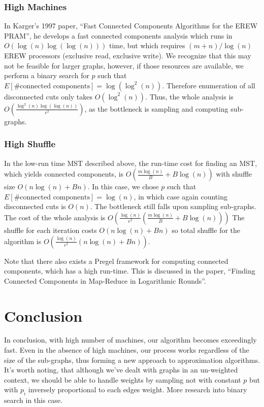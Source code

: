 \documentclass[12pt]{article}
\begin{document}
\subsubsection{High Machines}
In Karger's 1997 paper, ``Fast Connected Components Algorithms for the EREW PRAM'', he develops a fast connected components analysis which runs in $O(\log(n) \log(\log(n)))$ time, but which requires $(m + n)/\log(n)$ EREW processors (exclusive read, exclusive write). We recognize that this may not be feasible for larger graphs, however, if those resources are available, we perform a binary search for $p$ such that $E[\text{\# connected components}] = \log(\log^2(n))$. Therefore enumeration of all disconnected cuts only takes $O(\log^2(n))$. Thus, the whole analysis is $O(\frac{\log^2(n) \log(\log(n))}{\epsilon^2})$, as the bottleneck is sampling and computing sub-graphs.

\subsubsection{High Shuffle}

In the low-run time MST described above, the run-time cost for finding an MST, which yields connected components, is $O(\frac{m \log(n)}{B} + B\log(n))$ with shuffle size $O(n\log(n) + Bn)$. In this case, we chose $p$ such that $E[\text{\# connected components}] = \log(n)$, in which case again counting disconnected cuts is $O(n)$. The bottleneck still falls upon sampling sub-graphs. The cost of the whole analysis is $O(\frac{\log(n)}{\epsilon^2} (\frac{m \log(n)}{B} + B \log(n)))$ The shuffle for each iteration costs $O(n\log(n) + Bn)$ so total shuffle for the algorithm is $O(\frac{\log(n)}{\epsilon^2}(n\log(n) + Bn))$.

Note that there also exists a Pregel framework for computing connected components, which has a high run-time. This is discussed in the paper, ``Finding Connected Components in Map-Reduce in Logarithmic Rounds''.

\section{Conclusion} In conclusion, with high number of machines, our algorithm becomes exceedingly fast. Even in the absence of high machines, our process works regardless of the size of the sub-graphs, thus forming a new approach to approximation algorithms. It's worth noting, that although we've dealt with graphs in an un-weighted context, we should be able to handle weights by sampling not with constant $p$ but with $p_i$ inversely proportional to each edges weight. More research into binary search in this case.
\end{document}
